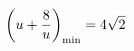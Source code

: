 \documentclass[preview]{standalone}
\begin{document}
\begin{align*}
\special{dvisvgm:raw <g id='unique000'>}\left(u+\frac{8}{u}\right)_{\min}=4\sqrt2\special{dvisvgm:raw </g>}
\end{align*}
\end{document}
